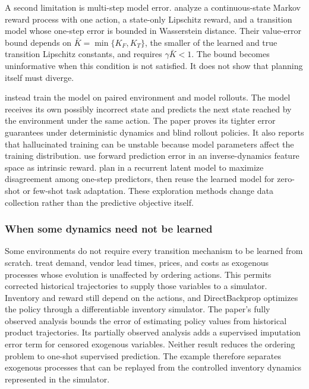 A second limitation is multi-step model error. \citet{Asadi2018Lipschitz} analyze a continuous-state Markov reward process with one action, a state-only Lipschitz reward, and a transition model whose one-step error is bounded in Wasserstein distance. Their value-error bound depends on $\bar K=\min\{K_F,K_T\}$, the smaller of the learned and true transition Lipschitz constants, and requires $\gamma\bar K<1$. The bound becomes uninformative when this condition is not satisfied. It does not show that planning itself must diverge.

\citet{Talvitie2017} instead train the model on paired environment and model rollouts. The model receives its own possibly incorrect state and predicts the next state reached by the environment under the same action. The paper proves its tighter error guarantees under deterministic dynamics and blind rollout policies. It also reports that hallucinated training can be unstable because model parameters affect the training distribution. \citet{Pathak2017} use forward prediction error in an inverse-dynamics feature space as intrinsic reward. \citet{Sekar2020} plan in a recurrent latent model to maximize disagreement among one-step predictors, then reuse the learned model for zero-shot or few-shot task adaptation. These exploration methods change data collection rather than the predictive objective itself.

\subsubsection{When some dynamics need not be learned}
\label{section:fc_synthesis_boundary}

Some environments do not require every transition mechanism to be learned from scratch. \citet{Madeka2022DeepInventory} treat demand, vendor lead times, prices, and costs as exogenous processes whose evolution is unaffected by ordering actions. This permits corrected historical trajectories to supply those variables to a simulator. Inventory and reward still depend on the actions, and DirectBackprop optimizes the policy through a differentiable inventory simulator. The paper's fully observed analysis bounds the error of estimating policy values from historical product trajectories. Its partially observed analysis adds a supervised imputation error term for censored exogenous variables. Neither result reduces the ordering problem to one-shot supervised prediction. The example therefore separates exogenous processes that can be replayed from the controlled inventory dynamics represented in the simulator.

